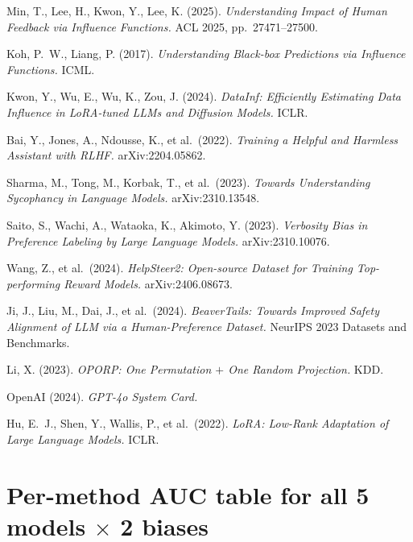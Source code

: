 \documentclass[11pt,a4paper]{article}
\begin{document}
\begin{description}
    \item Min, T., Lee, H., Kwon, Y., Lee, K. (2025). \emph{Understanding Impact of Human
    Feedback via Influence Functions.} ACL 2025, pp.\ 27471--27500.

    \item Koh, P.\ W., Liang, P. (2017). \emph{Understanding Black-box Predictions via
    Influence Functions.} ICML.

    \item Kwon, Y., Wu, E., Wu, K., Zou, J. (2024). \emph{DataInf: Efficiently Estimating Data
    Influence in LoRA-tuned LLMs and Diffusion Models.} ICLR.

    \item Bai, Y., Jones, A., Ndousse, K., et al.\ (2022). \emph{Training a Helpful and
    Harmless Assistant with RLHF.} arXiv:2204.05862.

    \item Sharma, M., Tong, M., Korbak, T., et al.\ (2023). \emph{Towards Understanding
    Sycophancy in Language Models.} arXiv:2310.13548.

    \item Saito, S., Wachi, A., Wataoka, K., Akimoto, Y. (2023). \emph{Verbosity Bias in
    Preference Labeling by Large Language Models.} arXiv:2310.10076.

    \item Wang, Z., et al.\ (2024). \emph{HelpSteer2: Open-source Dataset for Training Top-performing Reward Models.} arXiv:2406.08673.

    \item Ji, J., Liu, M., Dai, J., et al.\ (2024). \emph{BeaverTails: Towards Improved Safety
    Alignment of LLM via a Human-Preference Dataset.} NeurIPS 2023 Datasets and Benchmarks.

    \item Li, X. (2023). \emph{OPORP: One Permutation $+$ One Random Projection.} KDD.

    \item OpenAI (2024). \emph{GPT-4o System Card.}

    \item Hu, E.\ J., Shen, Y., Wallis, P., et al.\ (2022). \emph{LoRA: Low-Rank Adaptation of
    Large Language Models.} ICLR.
\end{description}

\appendix
\section{Per-method AUC table for all 5 models $\times$ 2 biases}
\label{app:full_baseline_table}
\end{document}
